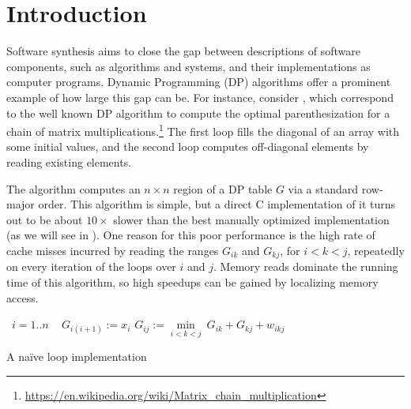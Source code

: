 \section{Introduction}
\label{intro}

\newcommand\ForLine[1]{\State\algorithmicfor~{#1} \algorithmicdo~}
\newcommand\Head[1]{\Comment{ {\it #1} ~~}}

Software synthesis aims to close the gap between descriptions of software components, such as algorithms and systems, and their implementations as computer programs. Dynamic Programming (DP) algorithms offer a prominent example of how large this gap can be. For instance, consider  
\cbstart{}%
, which correspond to the well known DP algorithm to compute the optimal parenthesization for a chain of matrix multiplications.\footnote{\fontsize{6}{6}\selectfont\url{https://en.wikipedia.org/wiki/Matrix_chain_multiplication}}
The first loop fills the diagonal of an array with some initial values,
and the second loop computes off-diagonal elements by reading existing elements.
\cbend

The algorithm computes an $n\times n$ region of a DP table $G$ via a standard row-major order. This algorithm is simple, but a direct C implementation of it turns out to be about
$10\times$ slower than the best manually optimized implementation \cbstart(as we will see in )\cbend. 
One reason for this poor performance is the high rate of cache misses incurred by reading the ranges $G_{ik}$ and $G_{kj}$, for $i<k<j$, repeatedly on every iteration of the loops over $i$ and $j$. Memory reads dominate the running time of this algorithm, so high speedups can be gained by localizing memory access.

\begin{algorithm}[b]
\renewcommand\arraystretch{1.3}
\begin{algorithmic}
  \ForLine{$i=1..n$}  $G_{i(i+1)} := x_i$    \Head{Initialize}
            \Head{Compute}
      \State $G_{ij} := \underset{i<k<j}\min ~ G_{ik} + G_{kj} + w_{ikj}$
    \EndFor
  \EndFor
\end{algorithmic}
\caption{\label{intro:naive}
   A na\"ive loop implementation}
\end{algorithm}


